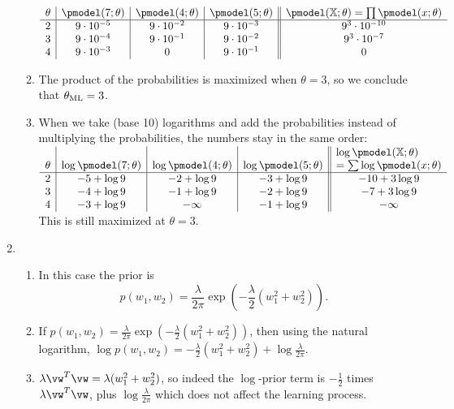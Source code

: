 \documentclass{article}
\begin{document}
\begin{enumerate}
\begin{enumerate}
        $\begin{array}{c|c|c|c||c}
            \theta & \pmodel(7; \theta) & \pmodel(4; \theta) & \pmodel(5; \theta) & \pmodel(\mathbb{X}; \theta) = \prod \pmodel(x;\theta) \\
            \hline
            2 & 9 \cdot 10^{-5} & 9 \cdot 10^{-2} & 9 \cdot 10^{-3} & 9^3 \cdot 10^{-10}\\
            3 & 9 \cdot 10^{-4} & 9 \cdot 10^{-1} & 9 \cdot 10^{-2} & 9^3 \cdot 10^{-7}\\
            4 & 9 \cdot 10^{-3} & 0 & 9 \cdot 10^{-1} & 0\\
        \end{array}$
        \item The product of the probabilities is maximized when $\theta = 3$, so we conclude that $\theta_\textnormal{ML} = 3$. 
        \item When we take (base 10) logarithms and add the probabilities instead of multiplying the probabilities, the numbers stay in the same order:
        $\begin{array}{c|c|c|c||c}
            \theta & \log\pmodel(7; \theta) & \log\pmodel(4; \theta) & \log\pmodel(5; \theta) & \vbox{\hbox{\strut$\log\pmodel(\mathbb{X}; \theta)$}\hbox{\strut $= \sum \log\pmodel(x;\theta)$}} \\
            \hline
            2 & -5 + \log 9 & -2 + \log 9 & -3 + \log 9 & -10 + 3 \log 9 \\
            3 & -4 + \log 9 & -1 + \log 9 & -2 + \log 9 & -7  + 3 \log 9 \\
            4 & -3 + \log 9 & -\infty     & -1 + \log 9 & -\infty \\
        \end{array}$
        This is still maximized at $\theta = 3$.
    \end{enumerate}
\item 
    \begin{enumerate}
        \item In this case the prior is 
$$p(w_1, w_2) = \frac{\lambda}{2\pi}\exp\left(-\frac\lambda2(w_1^2+w_2^2)\right).$$
        \item If $p(w_1, w_2) = \frac{\lambda}{2\pi}\exp\left(-\frac\lambda2(w_1^2+w_2^2)\right)$, then using the natural logarithm, $\log p(w_1,w_2) = - \frac{\lambda}{2}(w_1^2+w_2^2) + \log \frac{\lambda}{2\pi}$. 
        \item $\lambda \vw^T \vw = \lambda(w_1^2 + w_2^2)$, so indeed the $\log$-prior term is $-\frac12$ times $\lambda \vw^T \vw$, plus $\log\frac\lambda{2\pi}$ which does not affect the learning process.
    \end{enumerate}


\end{enumerate}
\end{document}
